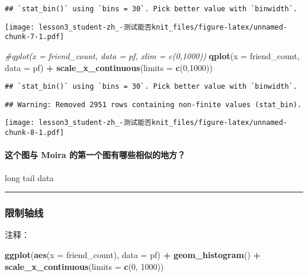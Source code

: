 \documentclass[]{article}
\newenvironment{Shaded}{\begin{snugshade}}{\end{snugshade}}
\newcommand{\CommentTok}[1]{\textcolor[rgb]{0.56,0.35,0.01}{\textit{#1}}}
\newcommand{\DataTypeTok}[1]{\textcolor[rgb]{0.13,0.29,0.53}{#1}}
\newcommand{\DecValTok}[1]{\textcolor[rgb]{0.00,0.00,0.81}{#1}}
\newcommand{\KeywordTok}[1]{\textcolor[rgb]{0.13,0.29,0.53}{\textbf{#1}}}
\newcommand{\NormalTok}[1]{#1}
\newcommand{\OperatorTok}[1]{\textcolor[rgb]{0.81,0.36,0.00}{\textbf{#1}}}
\newcommand{\StringTok}[1]{\textcolor[rgb]{0.31,0.60,0.02}{#1}}
\let\oldparagraph\paragraph
\renewcommand{\paragraph}[1]{\oldparagraph{#1}\mbox{}}
\begin{document}
\begin{verbatim}
## `stat_bin()` using `bins = 30`. Pick better value with `binwidth`.
\end{verbatim}

\texttt{[image: lesson3\_student-zh\_-测试能否knit\_files/figure-latex/unnamed-chunk-7-1.pdf]}

\begin{Shaded}
\begin{Highlighting}[]
\CommentTok{#qplot(x = friend_count, data = pf, xlim = c(0,1000))}
\KeywordTok{qplot}\NormalTok{(}\DataTypeTok{x =}\NormalTok{ friend_count, }\DataTypeTok{data =}\NormalTok{ pf) }\OperatorTok{+}\StringTok{ }
\StringTok{  }\KeywordTok{scale_x_continuous}\NormalTok{(}\DataTypeTok{limits =} \KeywordTok{c}\NormalTok{(}\DecValTok{0}\NormalTok{,}\DecValTok{1000}\NormalTok{))}
\end{Highlighting}
\end{Shaded}

\begin{verbatim}
## `stat_bin()` using `bins = 30`. Pick better value with `binwidth`.
\end{verbatim}

\begin{verbatim}
## Warning: Removed 2951 rows containing non-finite values (stat_bin).
\end{verbatim}

\texttt{[image: lesson3\_student-zh\_-测试能否knit\_files/figure-latex/unnamed-chunk-8-1.pdf]}

\hypertarget{-moira-}{%
\paragraph{这个图与 Moira 的第一个图有哪些相似的地方？}\label{-moira-}}

long tail data

\begin{center}\rule{0.5\linewidth}{\linethickness}\end{center}

\subsubsection{限制轴线}

注释：

\begin{Shaded}
\begin{Highlighting}[]
\KeywordTok{ggplot}\NormalTok{(}\KeywordTok{aes}\NormalTok{(}\DataTypeTok{x =}\NormalTok{ friend_count), }\DataTypeTok{data =}\NormalTok{ pf) }\OperatorTok{+}\StringTok{ }
\StringTok{  }\KeywordTok{geom_histogram}\NormalTok{() }\OperatorTok{+}\StringTok{ }
\KeywordTok{scale_x_continuous}\NormalTok{(}\DataTypeTok{limits =} \KeywordTok{c}\NormalTok{(}\DecValTok{0}\NormalTok{, }\DecValTok{1000}\NormalTok{))}
\end{Highlighting}
\end{Shaded}
\end{document}
